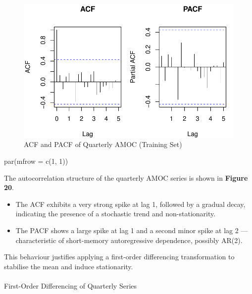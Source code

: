 \documentclass[
  11pt,
]{article}
\makeatletter
\let\oldparagraph\paragraph
\renewcommand{\paragraph}{
    \@ifstar
      \xxxParagraphStar
      \xxxParagraphNoStar
  }
\newcommand{\xxxParagraphStar}[1]{\oldparagraph*{#1}\mbox{}}
\newcommand{\xxxParagraphNoStar}[1]{\oldparagraph{#1}\mbox{}}
\newenvironment{Shaded}{\begin{snugshade}}{\end{snugshade}}
\newcommand{\AttributeTok}[1]{\textcolor[rgb]{0.40,0.45,0.13}{#1}}
\newcommand{\DecValTok}[1]{\textcolor[rgb]{0.68,0.00,0.00}{#1}}
\newcommand{\FunctionTok}[1]{\textcolor[rgb]{0.28,0.35,0.67}{#1}}
\newcommand{\NormalTok}[1]{\textcolor[rgb]{0.00,0.23,0.31}{#1}}
\makeatother
\begin{document}
\begin{figure}[H]

{\centering \includegraphics{project_files/figure-pdf/fig-acf-pacf-quarterly-1.pdf}

}

\caption{ACF and PACF of Quarterly AMOC (Training Set)}

\end{figure}%

\begin{Shaded}
\begin{Highlighting}[]
\FunctionTok{par}\NormalTok{(}\AttributeTok{mfrow =} \FunctionTok{c}\NormalTok{(}\DecValTok{1}\NormalTok{, }\DecValTok{1}\NormalTok{))}
\end{Highlighting}
\end{Shaded}

The autocorrelation structure of the quarterly AMOC series is shown in
\textbf{Figure 20}.

\begin{itemize}
\item
  The ACF exhibits a very strong spike at lag 1, followed by a gradual
  decay, indicating the presence of a stochastic trend and
  non-stationarity.
\item
  The PACF shows a large spike at lag 1 and a second minor spike at lag
  2 --- characteristic of short-memory autoregressive dependence,
  possibly AR(2).
\end{itemize}

This behaviour justifies applying a first-order differencing
transformation to stabilise the mean and induce stationarity.

\paragraph{First-Order Differencing of Quarterly
Series}\label{first-order-differencing-of-quarterly-series}
\end{document}

